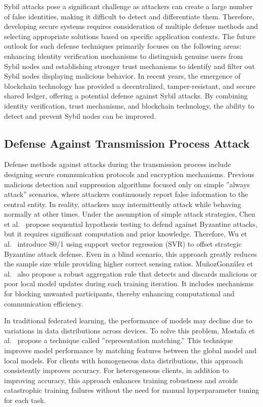 \documentclass[pdflatex,sn-mathphys-num]{sn-jnl}%
\theoremstyle{thmstyleone}%
\theoremstyle{thmstyletwo}%
\theoremstyle{thmstylethree}%
\begin{document}
Sybil attacks pose a significant challenge as attackers
can create a large number of false identities, making it
diﬀicult to detect and differentiate them. Therefore,
developing secure systems requires consideration of multiple
defense methods and selecting appropriate solutions based
on specific application contexts. The future outlook for
such defense techniques primarily focuses on the following
areas: enhancing identity verification mechanisms to
distinguish genuine users from Sybil nodes and establishing
stronger trust mechanisms to identify and filter out Sybil
nodes displaying malicious behavior. In recent years,
the emergence of blockchain technology has provided a
decentralized, tamper-resistant, and secure shared ledger,
offering a potential defense against Sybil attacks. By
combining identity verification, trust mechanisms, and
blockchain technology, the ability to detect and prevent
Sybil nodes can be improved.

\subsection{Defense Against Transmission Process Attack}
Defense methods against attacks during the transmission
process include designing secure communication
protocols and encryption mechanisms. Previous malicious detection and suppression
algorithms focused only on simple ”always attack” scenarios,
where attackers continuously report false information to
the central entity. In reality, attackers may intermittently
attack while behaving normally at other times. Under the
assumption of simple attack strategies, Chen et al.~\cite{chen2012robustness}
propose sequential hypothesis testing to defend against
Byzantine attacks, but it requires significant
computation and prior knowledge. Therefore, Wu et al.~\cite{wu2018sequential}
introduce S0/1 using support vector regression (SVR)
to offset strategic Byzantine attack defense. Even in a
blind scenario, this approach greatly reduces the sample
size while providing higher correct sensing ratios.
MuñozGonzález et al.~\cite{munoz2019byzantine} also propose a robust aggregation
rule that detects and discards malicious or poor local
model updates during each training iteration. It includes
mechanisms for blocking unwanted participants, thereby
enhancing computational and communication eﬀiciency.

In traditional federated learning, the performance of
models may decline due to variations in data distributions
across devices. To solve this problem, Mostafa et al.~\cite{mostafa2019robust}
propose a technique called ”representation matching.”
This technique improves model performance by matching
features between the global model and local models. For
clients with homogeneous data distributions, this approach
consistently improves accuracy. For heterogeneous clients,
in addition to improving accuracy, this approach enhances
training robustness and avoids catastrophic training
failures without the need for manual hyperparameter tuning
for each task.
\end{document}
